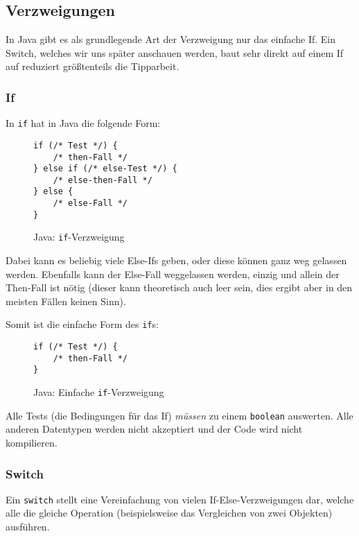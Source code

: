 \subsection{Verzweigungen}

	In Java gibt es als grundlegende Art der Verzweigung nur das einfache If. Ein Switch, welches wir uns später anschauen werden, baut sehr direkt auf einem If auf reduziert größtenteils die Tipparbeit.

	\subsubsection{If}
		In \texttt{if} hat in Java die folgende Form:
		\begin{figure}[H]
			\centering
			\begin{lstlisting}
if (/* Test */) {
	/* then-Fall */
} else if (/* else-Test */) {
	/* else-then-Fall */
} else {
	/* else-Fall */
}
			\end{lstlisting}
			\caption{Java: \texttt{if}-Verzweigung}
		\end{figure}
		
		Dabei kann es beliebig viele Else-Ifs geben, oder diese können ganz weg gelassen werden. Ebenfalls kann der Else-Fall weggelassen werden, einzig und allein der Then-Fall ist nötig (dieser kann theoretisch auch leer sein, dies ergibt aber in den meisten Fällen keinen Sinn).
		
		Somit ist die einfache Form des \texttt{if}s:
		\begin{figure}[H]
			\centering
			\begin{lstlisting}
if (/* Test */) {
	/* then-Fall */
}
			\end{lstlisting}
			\caption{Java: Einfache \texttt{if}-Verzweigung}
		\end{figure}
		
		Alle Tests (die Bedingungen für das If) \textit{müssen} zu einem \texttt{boolean} auswerten. Alle anderen Datentypen werden nicht akzeptiert und der Code wird nicht kompilieren.
	
	\subsubsection{Switch}
		Ein \texttt{switch} stellt eine Vereinfachung von vielen If-Else-Verzweigungen dar, welche alle die gleiche Operation (beispielsweise das Vergleichen von zwei Objekten) ausführen.
		
